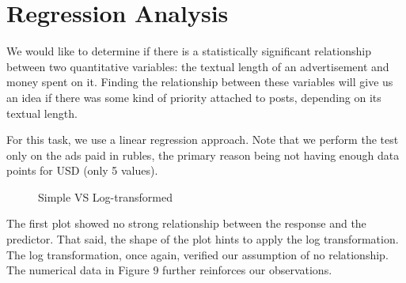 \documentclass[11pt]{article}
\begin{document}

\section*{\centering Regression Analysis}

We would like to determine if there is a statistically significant relationship
between two quantitative variables: the textual length of an advertisement and
money spent on it. Finding the relationship between these variables will give
us an idea if there was some kind of priority attached to posts, depending on
its textual length.

\bigskip

For this task, we use a linear regression approach. Note that we perform the
test only on the ads paid in rubles, the primary reason being not having enough
data points for USD (only 5 values).

\begin{figure}[H]
  \centering
  \hfill
  \caption{Simple VS Log-transformed}
  \label{fig:example}
\end{figure}

The first plot showed no strong relationship between the response and the
predictor. That said, the shape of the plot hints to apply the log
transformation. The log transformation, once again, verified our assumption
of no relationship. The numerical data in Figure 9 further reinforces our
observations.
\end{document}
